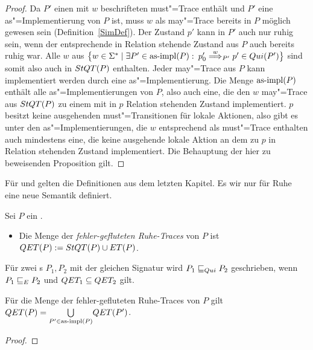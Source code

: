 \begin{proof}



  Da $P'$ einen mit $w$ beschrifteten must"=Trace enthält und $P'$ eine
  as"=Implementierung von $P$ ist, muss $w$ als may"=Trace bereits in $P$
  möglich gewesen sein (Definition~\ref{SimDef}). Der Zustand $p'$ kann in $P'$
  auch nur ruhig sein, wenn der entsprechende in Relation stehende Zustand aus
  $P$ auch bereits ruhig war. Alle $w$ aus $\big\{w\in\Sigma ^*\mid \exists
  P'\in\mathrm{as}\text{-}\mathrm{impl} (P):$ $p'_0 \weakmust[w]_{P'} p'\in Qui(P')\big\}$ sind somit also
  auch in $StQT (P)$ enthalten. Jeder may"=Trace aus $P$ kann implementiert
  werden durch eine as"=Implementierung. Die Menge $\mathrm{as}\text{-}\mathrm{impl} (P)$ enthält alle
  as"=Implementierungen von $P$, also auch eine, die den $w$ may"=Trace aus
  $StQT (P)$ zu einem mit in $p$ Relation stehenden Zustand implementiert. $p$
  besitzt keine ausgehenden must"=Transitionen für lokale Aktionen, also gibt es
  unter den as"=Implementierungen, die $w$ entsprechend als must"=Trace
  enthalten auch mindestens eine, die keine ausgehende lokale Aktion an dem zu
  $p$ in Relation stehenden Zustand implementiert. Die Behauptung der hier zu
  beweisenden Proposition gilt.
\end{proof}

Für \ET{} und \EL{} gelten die Definitionen aus dem letzten Kapitel. Es wir nur
für Ruhe eine neue Semantik definiert.

\begin{Def}
  Sei $P$ ein \MEIO{}.
  \begin{itemize}
    \item Die Menge der \emph{fehler-gefluteten Ruhe-Traces} von $P$ ist $QET
      (P):= StQT (P)\cup ET (P)$.
  \end{itemize}
  Für zwei \MEIO{}s $P_1,P_2$ mit der gleichen Signatur wird $P_1 \sqsubseteq  _{Qui}{} P_2$
  geschrieben, wenn $P_1 \sqsubseteq  _E{} P_2$ und $QET _1\subseteq QET _2$ gilt.
\end{Def}

\begin{Prop}
  Für die Menge der fehler-gefluteten Ruhe-Traces von $P$ gilt $QET (P) =
  \underset{P'\in\mathrm{as}\text{-}\mathrm{impl} (P)}{\bigcup} QET (P')$.
\end{Prop}
\begin{proof}
\end{proof}


